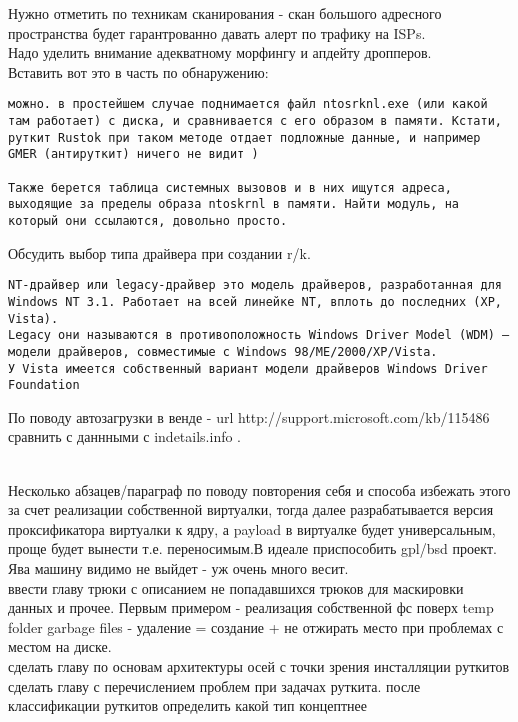 Нужно отметить по техникам сканирования - скан большого адресного пространства
будет гарантрованно давать алерт по трафику на ISPs.\\

Надо уделить внимание адекватному морфингу и апдейту дропперов.\\

Вставить вот это в часть по обнаружению:
\begin{verbatim}
можно. в простейшем случае поднимается файл ntosrknl.exe (или какой там работает) с диска, и сравнивается с его образом в памяти. Кстати, руткит Rustok при таком методе отдает подложные данные, и например GMER (антируткит) ничего не видит )

Также берется таблица системных вызовов и в них ищутся адреса, выходящие за пределы образа ntoskrnl в памяти. Найти модуль, на который они ссылаются, довольно просто.
\end{verbatim}

Обсудить выбор типа драйвера при создании r/k.

\begin{verbatim}
NT-драйвер или legacy-драйвер это модель драйверов, разработанная для Windows NT 3.1. Работает на всей линейке NT, вплоть до последних (XP, Vista).
Legacy они называются в противоположность Windows Driver Model (WDM) — модели драйверов, совместимые с Windows 98/ME/2000/XP/Vista.
У Vista имеется собственный вариант модели драйверов Windows Driver Foundation
\end{verbatim}

По поводу автозагрузки в венде - url http://support.microsoft.com/kb/115486 сравнить с даннными с indetails.info .

\\
Несколько абзацев/параграф по поводу повторения себя и способа избежать этого за счет реализации собственной виртуалки, тогда далее разрабатывается версия проксификатора виртуалки к ядру, а payload в виртуалке будет универсальным, проще будет вынести  т.е. переносимым.В идеале приспособить gpl/bsd проект. Ява машину видимо не выйдет - уж очень много весит.\\

ввести главу трюки с описанием не попадавшихся трюков для маскировки данных и прочее. Первым примером - реализация собственной фс поверх temp folder garbage files - удаление = создание + не отжирать место при проблемах с местом на диске.\\

сделать главу по основам архитектуры осей с точки зрения инсталляции руткитов
сделать главу с перечислением проблем при задачах руткита.
после классификации руткитов определить какой тип концептнее

